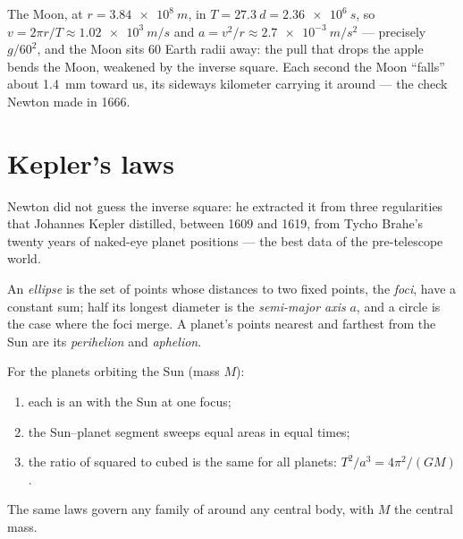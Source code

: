 \begin{example}\label{ex:g12:satellites-kepler:moon}
The Moon, at $r = \qty{3.84e8}{m}$,  in $T = \qty{27.3}{d} =
\qty{2.36e6}{s}$, so $v = 2\pi r/T \approx \qty{1.02e3}{m/s}$ and
$a = v^2/r \approx \qty{2.7e-3}{m/s^2}$ --- precisely $g/60^2$, and
the Moon sits $60$ Earth radii away: the pull that drops the apple
bends the Moon, weakened by the inverse square. Each second the
Moon ``falls'' about \qty{1.4}{mm} toward us, its sideways
kilometer carrying it around --- the check Newton made in 1666.
\end{example}

\section{Kepler's laws}

Newton did not guess the inverse square: he extracted it from three
regularities that Johannes Kepler distilled, between 1609 and 1619,
from Tycho Brahe's twenty years of naked-eye planet positions ---
the best data of the pre-telescope world.

\begin{definition}[Ellipse]\label{def:g12:satellites-kepler:ellipse}
An \emph{ellipse} is the set of points whose
distances to two fixed points, the \emph{foci}, have a constant sum; half its longest diameter is the
\emph{semi-major axis} $a$, and a circle is
the case where the foci merge. A planet's  points nearest and
farthest from the Sun are its \emph{perihelion}
and \emph{aphelion}.
\end{definition}

\begin{theorem}\label{thm:g12:satellites-kepler:kepler}
%
For the planets orbiting the Sun (mass $M$):
\begin{enumerate}
  \item each  is an  with the Sun at one focus;
  \item the Sun--planet segment sweeps equal areas in equal times;
  \item the ratio of squared  to cubed  is the
        same for all planets: $T^2/a^3 = 4\pi^2/(G M)$.
\end{enumerate}
The same laws govern any family of  around any central
body, with $M$ the central mass. \admitted
\end{theorem}

